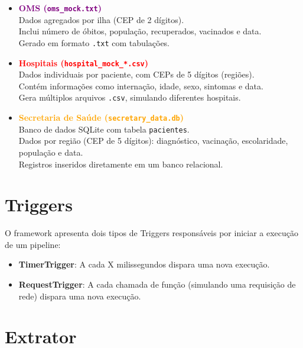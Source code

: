 \documentclass[a4paper,12pt]{article}
\begin{document}
\begin{itemize}
    \item \textcolor{purple}{\textbf{OMS (\texttt{oms\_mock.txt})}}\\
    Dados agregados por ilha (CEP de 2 dígitos).\\
    Inclui número de óbitos, população, recuperados, vacinados e data.\\
    Gerado em formato \texttt{.txt} com tabulações.
    
    \vspace{0.5em}
    
    \item \textcolor{red}{\textbf{Hospitais (\texttt{hospital\_mock\_*.csv})}}\\
    Dados individuais por paciente, com CEPs de 5 dígitos (regiões).\\
    Contém informações como internação, idade, sexo, sintomas e data.\\
    Gera múltiplos arquivos \texttt{.csv}, simulando diferentes hospitais.
    
    \vspace{0.5em}
    
    \item \textcolor{orange}{\textbf{Secretaria de Saúde (\texttt{secretary\_data.db})}}\\
    Banco de dados SQLite com tabela \texttt{pacientes}.\\
    Dados por região (CEP de 5 dígitos): diagnóstico, vacinação, escolaridade, população e data.\\
    Registros inseridos diretamente em um banco relacional.
\end{itemize}

\section{Triggers}
O framework apresenta dois tipos de Triggers responsáveis por iniciar a execução de um pipeline:

\begin{itemize}
    \item \textbf{TimerTrigger}: A cada X milissegundos dispara uma nova execução.
    \item \textbf{RequestTrigger}: A cada chamada de função (simulando uma requisição de rede) dispara uma nova
execução.
\end{itemize}

\section{Extrator}
\end{document}
